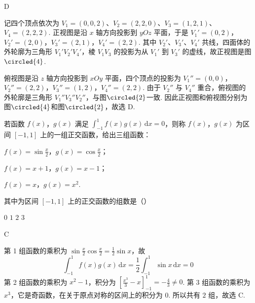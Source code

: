 \begin{answer}
D
\end{answer}

\begin{solution}
记四个顶点依次为 \(V_1=(0,0,2)\)、\(V_2=(2,2,0)\)、\(V_3=(1,2,1)\)、\(V_4=(2,2,2)\). 正视图是沿 \(x\) 轴方向投影到 \(yOz\) 平面，于是
\(V_1'=(0,2)\)，\(V_2'=(2,0)\)，\(V_3'=(2,1)\)，\(V_4'=(2,2)\).
其中 \(V_2'\)、\(V_3'\)、\(V_4'\) 共线，四面体的外轮廓为三角形 \(V_1'V_2'V_4'\)，棱 \(V_1V_3\) 的投影为从 \(V_1'\) 到 \(V_3'\) 的虚线，故正视图是图\(\circled{4}\).

俯视图是沿 \(z\) 轴方向投影到 \(xOy\) 平面，四个顶点的投影为
\(V_1''=(0,0)\)，\(V_2''=(2,2)\)，\(V_3''=(1,2)\)，\(V_4''=(2,2)\).
由于 \(V_2''\) 与 \(V_4''\) 重合，俯视图的外轮廓是三角形 \(V_1''V_3''V_2''\)，与图\(\circled{2}\)一致. 因此正视图和俯视图分别为图\(\circled{4}\)和图\(\circled{2}\)，故选 D.
\end{solution}

\begin{problem}
若函数 \(f(x)\)，\(g(x)\) 满足 \( \int_{-1}^{1} f(x) g(x) \, \mathrm{d}x = 0 \)，则称 \(f(x)\)，\(g(x)\) 为区间 \([-1, 1]\) 上的一组正交函数，给出三组函数：

\begin{circlelist}
\item \(f(x)=\sin\frac{x}{2}\)，\(g(x)=\cos\frac{x}{2}\)；
\item \(f(x)=x+1\)，\(g(x)=x-1\)；
\item \(f(x)=x\)，\(g(x)=x^{2}\).
\end{circlelist}

其中为区间 \([-1, 1]\) 上的正交函数的组数是（\quad）

\choices
    {\(0\)}
    {\(1\)}
    {\(2\)}
    {\(3\)}
\end{problem}

\begin{answer}
C
\end{answer}

\begin{solution}
第 1 组函数的乘积为 \(\sin\frac{x}{2}\cos\frac{x}{2}=\frac12\sin x\)，故
\[
\int_{-1}^{1}f(x)g(x)\,\mathrm{d}x=\frac12\int_{-1}^{1}\sin x\,\mathrm{d}x=0
\]
第 2 组函数的乘积为 \(x^2-1\)，积分为 \(\left[\frac{x^3}{3}-x\right]_{-1}^{1}=-\frac43\ne0\). 第 3 组函数的乘积为 \(x^3\)，它是奇函数，在关于原点对称的区间上的积分为 \(0\). 所以共有 \(2\) 组，故选 C.
\end{solution}

